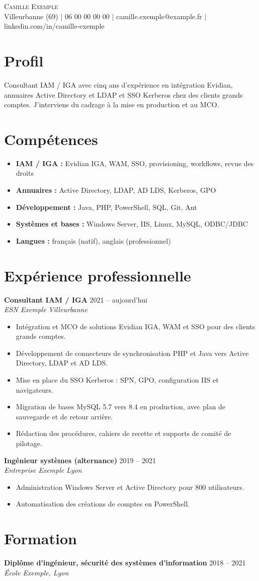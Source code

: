 \documentclass[a4paper,10.5pt]{article}
\newcommand{\resumeSubheading}[4]{\textbf{#1} \hfill #2\\ \textit{#3} \hfill \textit{#4}\vspace{-2pt}}
\newcommand{\resumeItem}[1]{\item #1}
\newenvironment{resumeItems}{\begin{itemize}[leftmargin=0.18in, itemsep=1pt, topsep=2pt]}{\end{itemize}\vspace{3pt}}
\begin{document}
\begin{center}
  {\Huge \scshape Camille Exemple}\\[3pt]
  Villeurbanne (69) $|$ 06 00 00 00 00 $|$ camille.exemple@example.fr $|$ linkedin.com/in/camille-exemple
\end{center}
\section*{Profil}
Consultant IAM / IGA avec cinq ans d'expérience en intégration Evidian, annuaires Active Directory et LDAP et SSO Kerberos chez des clients grands comptes. J'interviens du cadrage à la mise en production et au MCO.
\section*{Compétences}
\begin{itemize}[leftmargin=*, itemsep=0pt]
  \item \textbf{IAM / IGA :} Evidian IGA, WAM, SSO, provisioning, workflows, revue des droits
  \item \textbf{Annuaires :} Active Directory, LDAP, AD LDS, Kerberos, GPO
  \item \textbf{Développement :} Java, PHP, PowerShell, SQL, Git, Ant
  \item \textbf{Systèmes et bases :} Windows Server, IIS, Linux, MySQL, ODBC/JDBC
  \item \textbf{Langues :} français (natif), anglais (professionnel)
\end{itemize}
\section*{Expérience professionnelle}
\resumeSubheading{Consultant IAM / IGA}{2021 -- aujourd'hui}{ESN Exemple}{Villeurbanne}
\begin{resumeItems}
  \resumeItem{Intégration et MCO de solutions Evidian IGA, WAM et SSO pour des clients grands comptes.}
  \resumeItem{Développement de connecteurs de synchronisation PHP et Java vers Active Directory, LDAP et AD LDS.}
  \resumeItem{Mise en place du SSO Kerberos : SPN, GPO, configuration IIS et navigateurs.}
  \resumeItem{Migration de bases MySQL 5.7 vers 8.4 en production, avec plan de sauvegarde et de retour arrière.}
  \resumeItem{Rédaction des procédures, cahiers de recette et supports de comité de pilotage.}
\end{resumeItems}
\resumeSubheading{Ingénieur systèmes (alternance)}{2019 -- 2021}{Entreprise Exemple}{Lyon}
\begin{resumeItems}
  \resumeItem{Administration Windows Server et Active Directory pour 800 utilisateurs.}
  \resumeItem{Automatisation des créations de comptes en PowerShell.}
\end{resumeItems}
\section*{Formation}
\textbf{Diplôme d'ingénieur, sécurité des systèmes d'information} \hfill 2018 -- 2021\\
\textit{École Exemple, Lyon}
\end{document}
